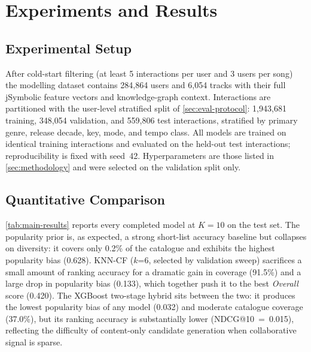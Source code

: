 \section{Experiments and Results}
\label{sec:results}

\subsection{Experimental Setup}

After cold-start filtering (at least 5 interactions per user and 3 users per
song) the modelling dataset contains 284{,}864 users and 6{,}054 tracks with
their full jSymbolic feature vectors and knowledge-graph context. Interactions
are partitioned with the user-level stratified split of \cref{sec:eval-protocol}:
1{,}943{,}681 training, 348{,}054 validation, and 559{,}806 test interactions,
stratified by primary genre, release decade, key, mode, and tempo class.
All models are trained on identical training interactions and evaluated on the
held-out test interactions; reproducibility is fixed with seed~42. Hyperparameters
are those listed in \cref{sec:methodology} and were selected on the validation split
only.

\subsection{Quantitative Comparison}

\cref{tab:main-results} reports every completed model at $K=10$ on the test
set. The popularity prior is, as expected, a strong short-list accuracy
baseline but collapses on diversity: it covers only 0.2\% of the catalogue and
exhibits the highest popularity bias (0.628). KNN-CF ($k$=6, selected by
validation sweep) sacrifices a small amount of ranking accuracy for a
dramatic gain in coverage (91.5\%) and a large drop in popularity bias
(0.133), which together push it to the best \emph{Overall} score (0.420).
The XGBoost two-stage hybrid sits between the two: it produces the lowest
popularity bias of any model (0.032) and moderate catalogue coverage (37.0\%),
but its ranking accuracy is substantially lower (NDCG@10~=~0.015), reflecting
the difficulty of content-only candidate generation when collaborative signal
is sparse. 

